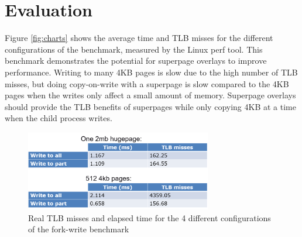 \chapter{Evaluation}



Figure \ref{fig:charts} shows the average time and TLB misses for the different configurations of the benchmark, measured by the Linux perf tool. This benchmark demonstrates the potential for superpage overlays to improve performance. Writing to many 4KB pages is slow due to the high number of TLB misses, but doing copy-on-write with a superpage is slow compared to the 4KB pages when the writes only affect a small amount of memory. Superpage overlays should provide the TLB benefits of superpages while only copying 4KB at a time when the child process writes.


\begin{figure}
    \centering
    \includegraphics[width=3.2in]{Figures/Table1}
    \caption{Real TLB misses and elapsed time for the 4 different configurations of the fork-write benchmark}
    \label{fig:tables}
\end{figure}
